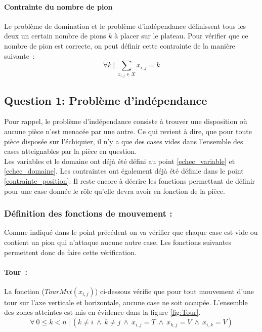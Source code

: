 \documentclass[a4paper,11pt]{article}
\newcommand{\AND}{~\wedge~}
\newcommand{\TQ}{~|~}
\begin{document}
			\paragraph{Contrainte du nombre de pion}
    			\label{nbr_pion}
            	Le problème de domination et le problème d'indépendance définissent tous les deux un certain nombre de pions $k$ à placer sur le plateau.  Pour vérifier que ce nombre de pion est correcte, on peut définir cette contrainte de la manière suivante~:
            	\[\forall k \TQ \sum\limits_{x_{i, j} \in X} x_{i, j} = k \]
        
        
    \subsection{Question 1: Problème d'indépendance}
        Pour rappel, le problème d'indépendance consiste à trouver une disposition où aucune pièce n'est menacée par une autre. Ce qui revient à dire, que pour toute pièce disposée sur l'échiquier, il n'y a que des cases vides dans l'ensemble des cases atteignables par la pièce en question.\\
        Les variables et le domaine ont déjà été défini au point \ref{echec_variable} et \ref{echec_domaine}.  Les contraintes ont également déjà été définie dans le point \ref{contrainte_position}.  Il reste encore à décrire les fonctions permettant de définir pour une case donnée le rôle qu'elle devra avoir en fonction de la pièce.
            
		\subsubsection{Définition des fonctions de mouvement :}
        	\label{independance_def_mvt}
        	Comme indiqué dans le point précédent on va vérifier que chaque case est vide ou contient un pion qui n'attaque aucune autre case.  Les fonctions suivantes permettent donc de faire cette vérification.
        	
          \paragraph{Tour~:} La fonction ($TourMvt(x_{i, j})$) ci-dessous vérifie que pour tout mouvement d'une tour sur l'axe verticale et horizontale, aucune case ne soit occupée. L'ensemble des zones atteintes est mis en évidence dans la figure \ref{fig:Tour}.
          	\[\forall~0 \leq k < n \TQ (k \neq i \AND k \neq j \AND x_{i, j} = T \AND x_{k, j} = V \AND x_{i, k} = V)\]
            
\end{document}
